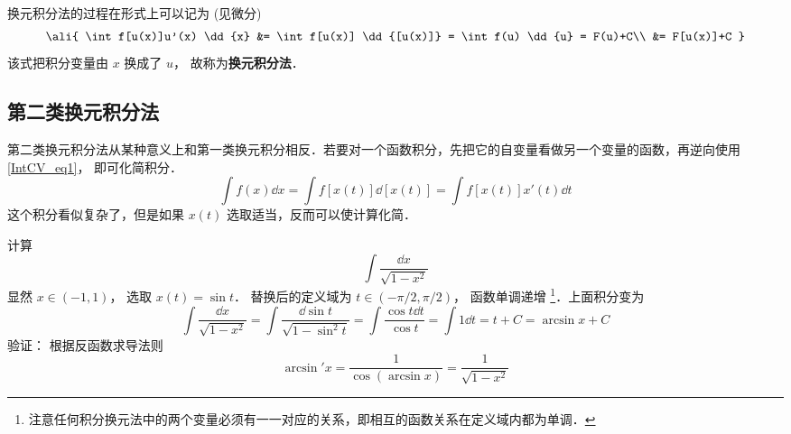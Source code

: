 换元积分法的过程在形式上可以记为 (见微分)
\begin{equation}\label{IntCV_eq1}
\ali{
\int f[u(x)]u'(x) \dd{x} &= \int f[u(x)] \dd{[u(x)]} = \int f(u) \dd{u} = F(u)+C\\
&= F[u(x)]+C
}\end{equation}
该式把积分变量由 $x$ 换成了 $u$， 故称为\textbf{换元积分法}．

\subsection{第二类换元积分法}
第二类换元积分法从某种意义上和第一类换元积分相反．若要对一个函数积分，先把它的自变量看做另一个变量的函数，再逆向使用\autoref{IntCV_eq1}， 即可化简积分．
\begin{equation}\label{IntCV_eq6}
\int f(x) \dd{x} = \int f[x(t)] \dd{[x(t)]} = \int f[x(t)]x'(t) \dd{t}
\end{equation}
这个积分看似复杂了，但是如果 $x(t)$ 选取适当，反而可以使计算化简．

\begin{exam}{}
计算
\begin{equation}
\int \frac{\dd{x}}{\sqrt{1-x^2}}
\end{equation}
显然 $x \in ( - 1,1)$， 选取 $x(t)=\sin t$． 替换后的定义域为 $t \in ( -\pi/2,\pi/2)$， 函数单调递增 \footnote{注意任何积分换元法中的两个变量必须有一一对应的关系，即相互的函数关系在定义域内都为单调．}．上面积分变为
\begin{equation}
\int \frac{\dd{x}}{\sqrt{1-x^2}}  = \int \frac{\dd{\sin t}}{\sqrt{1-\sin^2 t}} = \int \frac{\cos t\dd{t}}{\cos t}  = \int 1\dd{t}  = t + C = \arcsin x + C
\end{equation}
验证： 根据反函数求导法则
\begin{equation}
\arcsin'x = \frac{1}{\cos(\arcsin x)} = \frac{1}{\sqrt {1 - {x^2}} }
\end{equation}
\end{exam}




